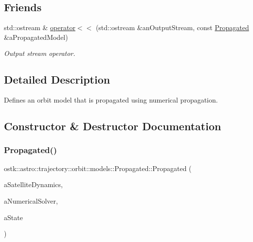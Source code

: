 \subsection*{Friends}
\begin{DoxyCompactItemize}
\item 
std\+::ostream \& \hyperlink{classostk_1_1astro_1_1trajectory_1_1orbit_1_1models_1_1_propagated_aa61df3429a00e0f64a497af2c81075c0}{operator$<$$<$} (std\+::ostream \&an\+Output\+Stream, const \hyperlink{classostk_1_1astro_1_1trajectory_1_1orbit_1_1models_1_1_propagated}{Propagated} \&a\+Propagated\+Model)
\begin{DoxyCompactList}\small\item\em Output stream operator. \end{DoxyCompactList}\end{DoxyCompactItemize}


\subsection{Detailed Description}
Defines an orbit model that is propagated using numerical propagation. 

\subsection{Constructor \& Destructor Documentation}
\mbox{\label{classostk_1_1astro_1_1trajectory_1_1orbit_1_1models_1_1_propagated_a2115209c1b1167f655ff648c38b1659f}} 
\subsubsection{\texorpdfstring{Propagated()}{Propagated()}\hspace{0.1cm}{\footnotesize\ttfamily [1/2]}}
{\footnotesize\ttfamily ostk\+::astro\+::trajectory\+::orbit\+::models\+::\+Propagated\+::\+Propagated (\begin{DoxyParamCaption}\item[{const \hyperlink{classostk_1_1astro_1_1flight_1_1system_1_1dynamics_1_1_satellite_dynamics}{Satellite\+Dynamics} \&}]{a\+Satellite\+Dynamics,  }\item[{const \hyperlink{classostk_1_1astro_1_1_numerical_solver}{Numerical\+Solver} \&}]{a\+Numerical\+Solver,  }\item[{const \hyperlink{classostk_1_1astro_1_1trajectory_1_1_state}{State} \&}]{a\+State }\end{DoxyParamCaption})}



